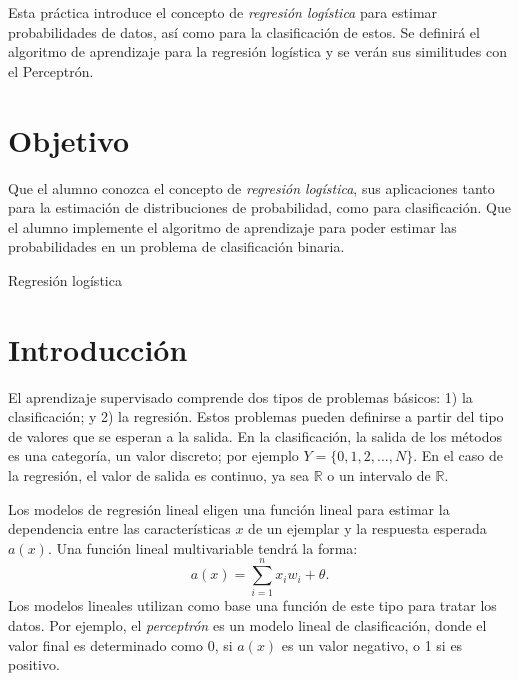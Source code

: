 
Esta práctica introduce el concepto de \emph{regresión logística} para estimar probabilidades de datos, así como para la clasificación de estos. Se definirá el algoritmo de aprendizaje para la regresión logística y se verán sus similitudes con el Perceptrón.


\section{Objetivo}

Que el alumno conozca el concepto de \textit{regresión logística}, sus aplicaciones tanto para la estimación de distribuciones de probabilidad, como para clasificación. Que el alumno implemente el algoritmo de aprendizaje para poder estimar las probabilidades en un problema de clasificación binaria.

\begin{auxcode}
 \caption{Regresión logística}
 \centering
\end{auxcode}


\section{Introducción}

El aprendizaje supervisado comprende dos tipos de problemas básicos: 1) la clasificación; y 2) la regresión. Estos problemas pueden definirse a partir del tipo de valores que se esperan a la salida. En la clasificación, la salida de los métodos es una categoría, un valor discreto; por ejemplo $Y = \{0,1,2,...,N\}$. En el caso de la regresión, el valor de salida es continuo, ya sea $\mathbb{R}$ o un intervalo de $\mathbb{R}$.

Los modelos de regresión lineal eligen una función lineal para estimar la dependencia entre las características $x$ de un ejemplar y la respuesta esperada $a(x)$. Una función lineal multivariable tendrá la forma: $$a(x) = \sum_{i=1}^n x_iw_i + \theta.$$
Los modelos lineales utilizan como base una función de este tipo para tratar los datos. Por ejemplo, el \textit{perceptrón} es un modelo lineal de clasificación, donde el valor final es determinado como 0, si $a(x)$ es un valor negativo, o 1 si es positivo.

